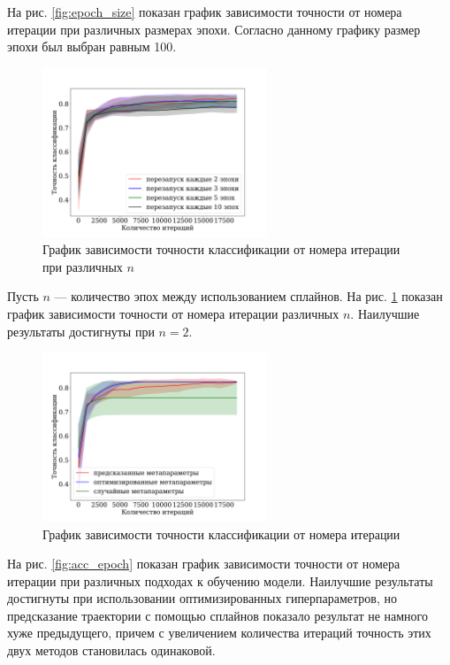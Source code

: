 \documentclass[12pt, twoside]{article}
\begin{document}
На рис. \ref{fig:epoch_size} показан график зависимости точности от номера итерации при различных размерах эпохи. Согласно данному  графику размер эпохи был выбран равным 100.

\begin{figure}[!ht]
    \centering
    \includegraphics[width=0.6\textwidth]{linear_train_splines_every_epoch.pdf}
    \caption{График зависимости точности классификации от номера итерации при различных $n$}
    \label{fig:train_splines_every_epoch}
\end{figure}

Пусть $n$ --- количество эпох между использованием сплайнов. На рис. \ref{fig:train_splines_every_epoch} показан график зависимости точности от номера итерации различных $n$. Наилучшие результаты достигнуты при $n=2$.

\begin{figure}[!ht]
    \centering
    \includegraphics[width=0.6\textwidth]{acc_iter.pdf}
    \caption{График зависимости точности классификации от номера итерации}
    \label{fig:acc_iter}
\end{figure}

На рис. \ref{fig:acc_epoch} показан график зависимости точности от номера итерации при различных подходах к обучению модели. Наилучшие результаты достигнуты при использовании оптимизированных гиперпараметров, но предсказание траектории с помощью сплайнов показало результат не намного хуже предыдущего, причем с увеличением количества итераций точность этих двух методов становилась одинаковой.
\end{document}
